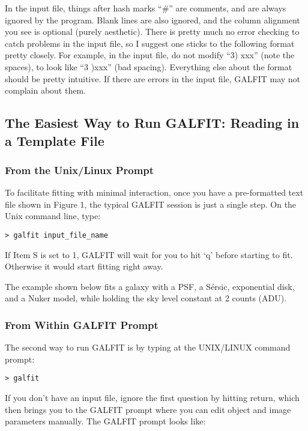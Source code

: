 \documentclass[preprint]{aastex}
\begin{document}
In the input file, things after hash marks ``\#'' are comments, and are always
ignored by the program.  Blank lines are also ignored, and the column
alignment you see is optional (purely aesthetic).  There is pretty much no
error checking to catch problems in the input file, so I suggest one sticks to
the following format pretty closely.  For example, in the input file, do not
modify ``3) xxx'' (note the spaces), to look like ``3 )xxx'' (bad spacing).
Everything else about the format should be pretty intuitive.  If there are
errors in the input file, GALFIT may not complain about them.

\subsection{The Easiest Way to Run GALFIT: Reading in a Template File}

\subsubsection {From the Unix/Linux Prompt}

To facilitate fitting with minimal interaction, once you have a pre-formatted
text file shown in Figure 1, the typical GALFIT session is just a single
step.  On the Unix command line, type:

\begin{verbatim}
> galfit input_file_name
\end{verbatim}

If Item S is set to 1, GALFIT will wait for you to hit `q' before starting to
fit.  Otherwise it would start fitting right away.

The example shown below fits a galaxy with a PSF, a S\'ersic, exponential
disk, and a Nuker model, while holding the sky level constant at 2 counts
(ADU).  

\subsubsection {From Within GALFIT Prompt}

The second way to run GALFIT is by typing at the UNIX/LINUX command prompt:

\begin{verbatim}
> galfit
\end{verbatim}

\noindent If you don't have an input file, ignore the first question by
hitting return, which then brings you to the GALFIT prompt where you can edit
object and image parameters manually.  The GALFIT prompt looks like:
\end{document}
